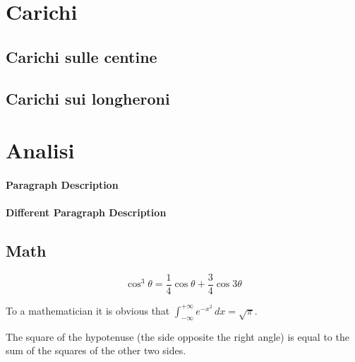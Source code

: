 \documentclass[
10pt, %
a4paper, %
oneside, %
headinclude,footinclude, %
BCOR5mm, %
]{scrartcl}
\begin{document}
\section{Carichi}

\subsection{Carichi sulle centine}


\subsection{Carichi sui longheroni}



\section{Analisi}

\newpage


\paragraph{Paragraph Description} \lipsum[7] %

\paragraph{Different Paragraph Description} \lipsum[8] %


\subsection{Math}

\lipsum[4] %

\begin{equation}
\cos^3 \theta =\frac{1}{4}\cos\theta+\frac{3}{4}\cos 3\theta
\label{eq:refname2}
\end{equation}

\lipsum[5] %

\begin{definition}[Gauss] 
To a mathematician it is obvious that
$\int_{-\infty}^{+\infty}
e^{-x^2}\,dx=\sqrt{\pi}$. 
\end{definition} 

\begin{theorem}[Pythagoras]
The square of the hypotenuse (the side opposite the right angle) is equal to the sum of the squares of the other two sides.
\end{theorem}
\end{document}
